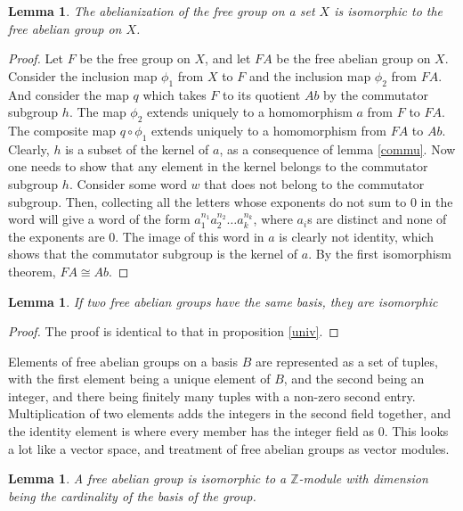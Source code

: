 \documentclass[12pt, titlepage]{article}
\newtheorem{lem}[thm]{Lemma}
\theoremstyle{definition}
\begin{document}
\begin{lem}\label{stuck}
The abelianization of the free group on a set $X$ is isomorphic to the free abelian group on $X$.
\end{lem}

\begin{proof}
Let $F$ be the free group on $X$, and let $FA$ be the free abelian group on $X$. Consider the inclusion map $\phi_1$ from $X$ to $F$ and the inclusion map $\phi_2$ from $FA$. And consider the map $q$ which takes $F$ to its quotient $Ab$ by the commutator subgroup $h$. The map $\phi_2$ extends uniquely to a homomorphism $a$ from $F$ to $FA$. The composite map $q \circ \phi_1$ extends uniquely to a homomorphism from $FA$ to $Ab$. Clearly, $h$ is a subset of the kernel of $a$, as a consequence of lemma \autoref{commu}. Now one needs to show that any element in the kernel belongs to the commutator subgroup $h$. Consider some word $w$ that does not belong to the commutator subgroup. Then, collecting all the letters whose exponents do not sum to $0$ in the word will give a word of the form $a_1^{n_1}a_2^{n_2}\ldots a_k^{n_k}$, where $a_i$s are distinct and none of the exponents are $0$. The image of this word in $a$ is clearly not identity, which shows that the commutator subgroup is the kernel of $a$. By the first isomorphism theorem, $FA \cong Ab$.
\end{proof}

\begin{lem}
If two free abelian groups have the same basis, they are isomorphic
\end{lem}

\begin{proof}
The proof is identical to that in proposition \autoref{univ}.
\end{proof}

Elements of free abelian groups on a basis $B$ are represented as a set of tuples, with the first element being a unique element of $B$, and the second being an integer, and there being finitely many tuples with a non-zero second entry. Multiplication of two elements adds the integers in the second field together, and the identity element is where every member has the integer field as $0$. This looks a lot like a vector space, and treatment of free abelian groups as vector modules.

\begin{lem}
A free abelian group is isomorphic to a $\mathbb{Z}$-module with dimension being the cardinality of the basis of the group.
\end{lem}
\end{document}
